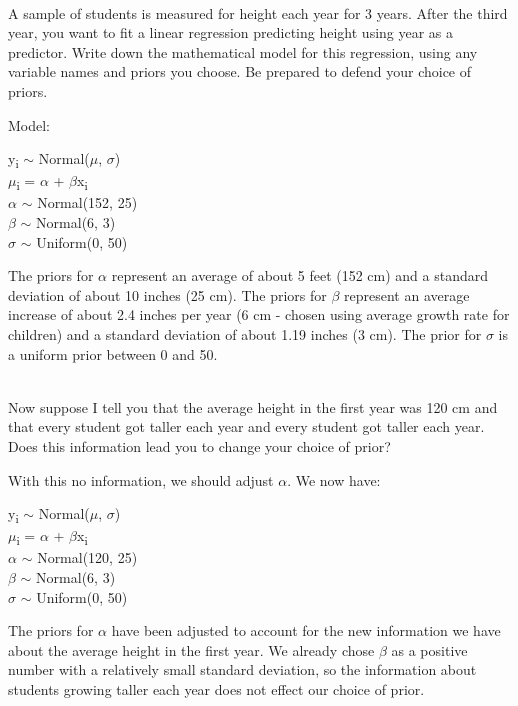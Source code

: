 \documentclass[12pt]{article}\usepackage[]{graphicx}\usepackage[]{color}
\newenvironment{problem}[2][Problem]{\begin{trivlist}
\item[\hskip \labelsep {\bfseries #1}\hskip \labelsep {\bfseries #2.}]}{\end{trivlist}}
\begin{document}
\begin{problem}{4M4}
\text{}\\
A sample of students is measured for height each year for 3 years. After the third year, you want to fit a linear regression predicting height using year as a predictor. Write down the mathematical model for this regression, using any variable names and priors you choose. Be prepared to defend your choice of priors.
\end{problem}

Model:
\begin{center}
y\textsubscript{i} $\sim$ Normal($\mu$, $\sigma$)\\
$\mu$\textsubscript{i} = $\alpha$ + $\beta$x\textsubscript{i}\\
$\alpha$ $\sim$ Normal(152, 25)\\
$\beta$ $\sim$ Normal(6, 3)\\
$\sigma$ $\sim$ Uniform(0, 50)
\end{center}

The priors for $\alpha$ represent an average of about 5 feet (152 cm) and a standard deviation of about 10 inches (25 cm).
The priors for $\beta$ represent an average increase of about 2.4 inches per year (6 cm - chosen using average growth rate for children) and a standard deviation of about 1.19 inches (3 cm).
The prior for $\sigma$ is a uniform prior between 0 and 50.

\begin{problem}{4M5}
\text{}\\
Now suppose I tell you that the average height in the first year was 120 cm and that every student got taller each year and every student got taller each year. Does this information lead you to change your choice of prior?
\end{problem}

With this no information, we should adjust $\alpha$. We now have:
\begin{center}
y\textsubscript{i} $\sim$ Normal($\mu$, $\sigma$)\\
$\mu$\textsubscript{i} = $\alpha$ + $\beta$x\textsubscript{i}\\
$\alpha$ $\sim$ Normal(120, 25)\\
$\beta$ $\sim$ Normal(6, 3)\\
$\sigma$ $\sim$ Uniform(0, 50)
\end{center}

The priors for $\alpha$ have been adjusted to account for the new information we have about the average height in the first year.
We already chose $\beta$ as a positive number with a relatively small standard deviation, so the information about students growing taller each year does not effect our choice of prior.
\end{document}
